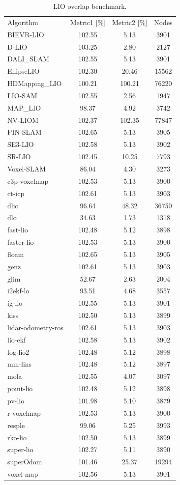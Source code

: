 \begin{table}[]
\centering
\begin{tabular}{lccc}
\rowcolor[HTML]{C0C0C0}
Algorithm & Metric1 [\%] & Metric2 [\%] & Nodes \\
BIEVR-LIO & 102.55 & 5.13 & 3901 \\
D-LIO & 103.25 & 2.80 & 2127 \\
DALI_SLAM & 102.55 & 5.13 & 3901 \\
EllipseLIO & 102.30 & 20.46 & 15562 \\
HDMapping_LIO & 100.21 & 100.21 & 76220 \\
LIO-SAM & 102.55 & 2.56 & 1947 \\
MAP_LIO & 98.37 & 4.92 & 3742 \\
NV-LIOM & 102.37 & 102.35 & 77847 \\
PIN-SLAM & 102.65 & 5.13 & 3905 \\
SE3-LIO & 102.58 & 5.13 & 3902 \\
SR-LIO & 102.45 & 10.25 & 7793 \\
Voxel-SLAM & 86.04 & 4.30 & 3273 \\
c3p-voxelmap & 102.53 & 5.13 & 3900 \\
ct-icp & 102.61 & 5.13 & 3903 \\
dlio & 96.64 & 48.32 & 36750 \\
dlo & 34.63 & 1.73 & 1318 \\
fast-lio & 102.48 & 5.12 & 3898 \\
faster-lio & 102.53 & 5.13 & 3900 \\
floam & 102.65 & 5.13 & 3905 \\
genz & 102.61 & 5.13 & 3903 \\
glim & 52.67 & 2.63 & 2004 \\
i2ekf-lo & 93.51 & 4.68 & 3557 \\
ig-lio & 102.55 & 5.13 & 3901 \\
kiss & 102.50 & 5.13 & 3899 \\
lidar-odometry-ros & 102.61 & 5.13 & 3903 \\
lio-ekf & 102.58 & 5.13 & 3902 \\
log-lio2 & 102.48 & 5.12 & 3898 \\
mm-lins & 102.48 & 5.12 & 3897 \\
mola & 102.55 & 4.07 & 3097 \\
point-lio & 102.48 & 5.12 & 3898 \\
pv-lio & 101.98 & 5.10 & 3879 \\
r-voxelmap & 102.53 & 5.13 & 3900 \\
resple & 99.06 & 5.25 & 3993 \\
rko-lio & 102.50 & 5.13 & 3899 \\
super-lio & 102.27 & 5.11 & 3890 \\
superOdom & 101.46 & 25.37 & 19294 \\
voxel-map & 102.56 & 5.13 & 3901 \\
\end{tabular}
\caption{LIO overlap benchmark.}
\label{tab:lio_overlap}
\end{table}